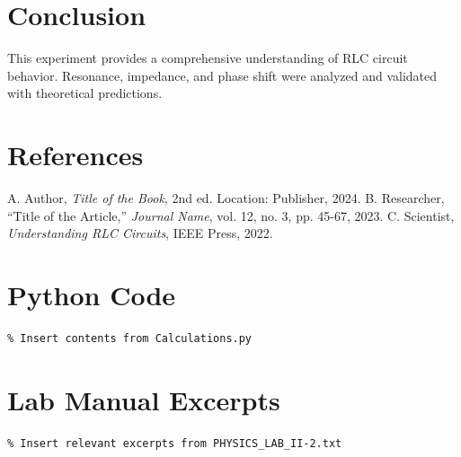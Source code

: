 \documentclass[journal]{IEEEtran}
\begin{document}
\section{Conclusion}
This experiment provides a comprehensive understanding of RLC circuit behavior. Resonance, impedance, and phase shift were analyzed and validated with theoretical predictions.

\section*{References}
\begin{thebibliography}{1}
     A. Author, \emph{Title of the Book}, 2nd ed. Location: Publisher, 2024.
     B. Researcher, ``Title of the Article,'' \emph{Journal Name}, vol. 12, no. 3, pp. 45-67, 2023.
     C. Scientist, \emph{Understanding RLC Circuits}, IEEE Press, 2022.
\end{thebibliography}

\appendices

\section{Python Code}
\begin{verbatim}
% Insert contents from Calculations.py
\end{verbatim}

\section{Lab Manual Excerpts}
\begin{verbatim}
% Insert relevant excerpts from PHYSICS_LAB_II-2.txt
\end{verbatim}
\end{document}

